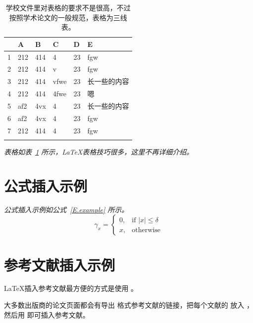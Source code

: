 \begin{table}[htb]
  \centering
  \caption{学校文件里对表格的要求不是很高，不过按照学术论文的一般规范，表格为三线表。}
  \label{T.example}
  \begin{tabular}{llllll}
  \hline
   & A  & B  & C  & D  & E \\
  \hline
1 	& 212 & 414 & 4 		& 23 & fgw	\\
2 	& 212 & 414 & v 		& 23 & fgw	\\
3 	& 212 & 414 & vfwe		& 23 & 长一些的内容	\\
4 	& 212 & 414 & 4fwe		& 23 & 嗯	\\
5 	& af2 & 4vx & 4 		& 23 & 长一些的内容	\\
6 	& af2 & 4vx & 4 		& 23 & fgw	\\
7 	& 212 & 414 & 4 		& 23 & fgw	\\

\hline{}
\end{tabular}
\end{table}

\emph{表格如表~\ref{T.example} 所示，\LaTeX 表格技巧很多，这里不再详细介绍。}

\lipsum

\newpage    %

\section{公式插入示例}

\lipsum

\emph{公式插入示例如公式~\eqref{E.example} 所示。}
\begin{equation}
\gamma_x=
\begin{cases}
  0, & \text{if $|x| \leq \delta$} \\
  x, & \text{otherwise}
\end{cases}
\label{E.example}
\end{equation}


\newpage    %

\section{参考文献插入示例}

\LaTeX \cite{lamport1994latex}插入参考文献最方便的方式是使用 \cite{pritchard1969statistical}。

大多数出版商的论文页面都会有导出  格式参考文献的链接，把每个文献的  放入 ，然后用  即可插入参考文献。

